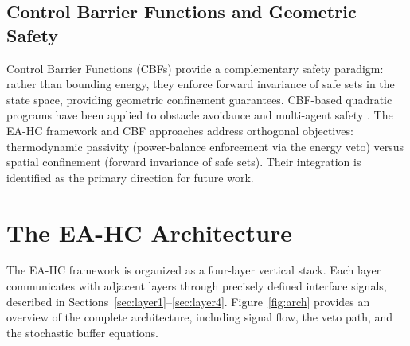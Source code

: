 \documentclass[11pt]{article}
\begin{document}
\subsection{Control Barrier Functions and Geometric Safety}

Control Barrier Functions (CBFs) \cite{ames2017} provide a complementary safety paradigm:
rather than bounding energy, they enforce forward invariance of safe sets in the state space,
providing geometric confinement guarantees. CBF-based quadratic programs have been applied
to obstacle avoidance \cite{ames2017} and multi-agent safety \cite{wang2017}. The EA-HC
framework and CBF approaches address orthogonal objectives: thermodynamic passivity
(power-balance enforcement via the energy veto) versus spatial confinement (forward
invariance of safe sets). Their integration is identified as the primary direction for future work.

\section{The EA-HC Architecture}
\label{sec:arch}

The EA-HC framework is organized as a four-layer vertical stack. Each layer communicates
with adjacent layers through precisely defined interface signals, described in
Sections~\ref{sec:layer1}--\ref{sec:layer4}. Figure~\ref{fig:arch} provides an overview of the
complete architecture, including signal flow, the veto path, and the stochastic buffer equations.
\end{document}
